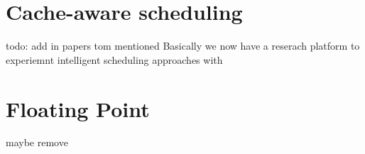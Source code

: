 \documentclass[bsc,frontabs,singlespacing,parskip,deptreport]{infthesis}     %
\begin{document}
\section{Cache-aware scheduling}
todo: add in papers tom mentioned
Basically we now have a reserach platform to experiemnt intelligent scheduling approaches with

\section{Floating Point}
maybe remove




\end{document}
